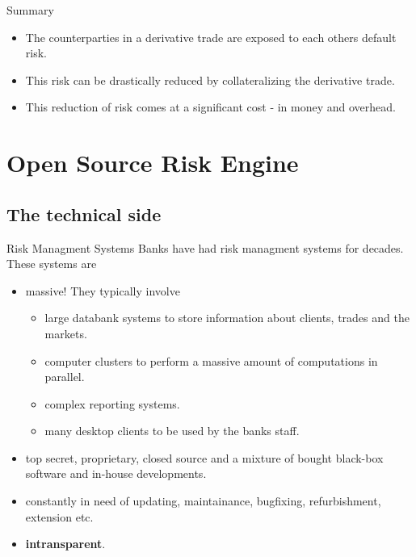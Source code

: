 \documentclass[t]{beamer}
\begin{document}
\begin{frame}{Summary}
	\begin{itemize}
		\item
			The counterparties in a derivative trade are exposed to each others default risk.
		\item
			This risk can be drastically reduced by collateralizing the derivative trade.
		\item
			This reduction of risk comes at a significant cost - in money and overhead.
	\end{itemize}
\end{frame}

\section{Open Source Risk Engine}

\subsection{The technical side}

\begin{frame}{Risk Managment Systems}
	Banks have had risk managment systems for decades. These systems are
	\begin{itemize}
		\item
			massive! They typically involve 
			\begin{itemize}
				\item 
					large databank systems to store information about clients, trades and the markets.
				\item
					computer clusters to perform a massive amount of computations in parallel.
				\item
					complex reporting systems.
				\item
					many desktop clients to be used by the banks staff.
			\end{itemize}
		\item
			top secret, proprietary, closed source and a mixture of bought black-box software and in-house developments.
		\item
			constantly in need of updating, maintainance, bugfixing, refurbishment, extension etc.
		\item
			\textbf{intransparent}.
	\end{itemize}
\end{frame}
\end{document}
